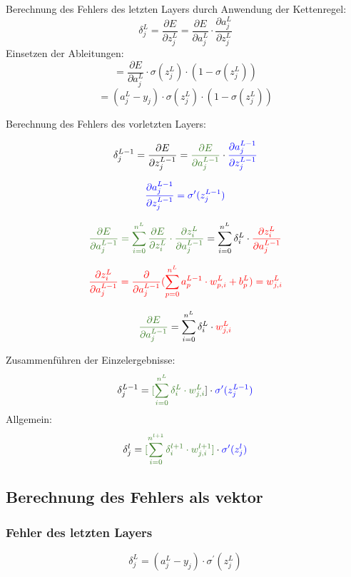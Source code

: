 \documentclass{article}
\begin{document}
Berechnung des Fehlers des letzten Layers durch Anwendung der Kettenregel:
\[ \delta_j^L  = \frac{\partial E}{\partial z_j^L}
= \frac{\partial E}{\partial a_j^L} \cdot \frac{\partial a_j^L}{\partial z_j^L}\]
Einsetzen der Ableitungen:
\[ = \frac{\partial E}{\partial a_j^L} \cdot \sigma (z_j^L) \cdot (1 - \sigma (z_j^L)) \]
\[ = (a_j^L - y_j) \cdot \sigma (z_j^L) \cdot (1 - \sigma (z_j^L)) \]

Berechnung des Fehlers des vorletzten Layers:

\[ \delta_j^{L-1}  = \frac{\partial E}{\partial z_j^{L-1}} 
= \textcolor{OliveGreen}{\frac{\partial E}{\partial a_j^{L-1}}} \cdot \textcolor{blue}{\frac{\partial a_j^{L-1}}{\partial z_j^{L-1}}} \]

\[ \textcolor{blue}{\frac{\partial a_j^{L-1}}{\partial z_j^{L-1}} = \sigma^{\prime}(z_j^{L-1})} \]

\[ \textcolor{OliveGreen}{ \frac{\partial E}{\partial a_j^{L-1}} = \sum_{i 
= 0}^{n^L} \frac{\partial E}{\partial z_i^L} \cdot \frac{\partial z_i^L}{\partial a_j^{L-1}} }
= \sum_{i = 0}^{n^L} \delta_i^L \cdot \textcolor{red}{ \frac{\partial z_i^L}{\partial a_j^{L-1}} } \]

\[ \textcolor{red}{ \frac{\partial z_i^L}{\partial a_j^{L-1}}
= \frac{\partial}{\partial a_j^{L-1}} (\sum_{p = 0}^{n^L} a_p^{L-1} \cdot w_{p,i}^L + b_p^L) = w_{j, i}^L } \]

\[ \textcolor{OliveGreen}{ \frac{\partial E}{\partial a_j^{L-1}} } = \sum_{i = 0}^{n^L} \delta_i^L \cdot \textcolor{red}{ w_{j,i}^L } \]

Zusammenführen der Einzelergebnisse:
\[ \delta_j^{L-1} = \textcolor{OliveGreen}{[\sum_{i = 0}^{n^{L}} \delta_i^{L} \cdot w_{j,i}^{L} }] \cdot \textcolor{blue}{ \sigma^{\prime}(z_j^{L-1}) } \]
Allgemein:
\[ \delta_j^{l} = \textcolor{OliveGreen}{ [\sum_{i = 0}^{n^{l+1}} \delta_i^{l+1} \cdot w_{j,i}^{l+1}] } \cdot \textcolor{blue}{ \sigma^{\prime}(z_j^{l}) } \]


\subsection{Berechnung des Fehlers als vektor}


\subsubsection{Fehler des letzten Layers}
\[ \delta_j^L = (a_j^L - y_j) \cdot \sigma^{\prime} (z_j^L)  \]
\end{document}
